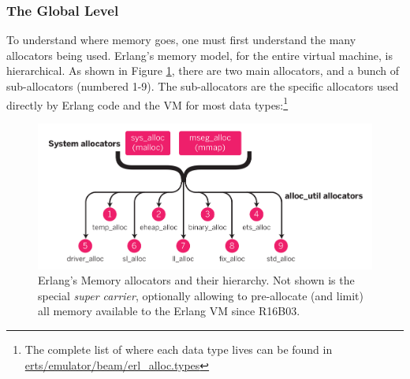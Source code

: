 \documentclass[11pt, oneside]{book}   	%
\begin{document}
\subsubsection{The Global Level}

To understand where memory goes, one must first understand the many allocators being used. Erlang's memory model, for the entire virtual machine, is hierarchical. As shown in Figure \ref{fig:allocators},  there are two main allocators, and a bunch of sub-allocators (numbered 1-9). The sub-allocators are the specific allocators used directly by Erlang code and the VM for most data types:\footnote{The complete list of where each data type lives can be found in \href{https://github.com/erlang/otp/blob/maint/erts/emulator/beam/erl\_alloc.types}{erts/emulator/beam/erl\_alloc.types}}


\begin{figure}
  \includegraphics{memory-allocs.pdf}%
  \caption{Erlang's Memory allocators and their hierarchy. Not shown is the special \emph{super carrier}, optionally allowing to pre-allocate (and limit) all memory available to the Erlang VM since R16B03.}%
   \label{fig:allocators}
\end{figure}
\end{document}
